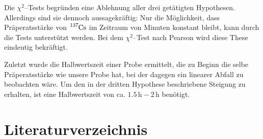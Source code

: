 \documentclass[12pt,a4paper]{scrartcl}
\numberwithin{equation}{section} %
\begin{document}
Die $\chi^2$--Tests begründen eine Ablehnung aller drei getätigten Hypothesen. Allerdings sind sie dennoch aussagekräftig: Nur die Möglichkeit, dass Präperatsstärke von $\ce{^{137}Cs}$ im Zeitraum von Minuten konstant bleibt, kann durch die Tests unterstützt werden. Bei dem $\chi^2$--Test nach Pearson wird diese These eindeutig bekräftigt.

Zuletzt wurde die Halbwertszeit einer Probe ermittelt, die zu Beginn die selbe Präperatsstärke wie unsere Probe hat, bei der dagegen ein linearer Abfall zu beobachten wäre. Um den in der dritten Hypothese beschriebene Steigung zu erhalten, ist eine Halbwertszeit von ca. $1.5\mathrm{\,h}-2\mathrm{\,h}$ benötigt.

\clearpage
\hypertarget{literatur}{\section{Literaturverzeichnis}\label{literatur}}
\renewcommand{\section}[2]{}
\end{document}
